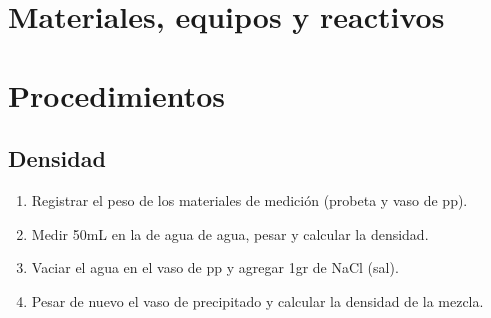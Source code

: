 \section{Materiales, equipos y reactivos}

\begin{table}[H]
\end{table}

\section{Procedimientos}

\subsection{Densidad}
\begin{enumerate}   
    \item Registrar el peso de los materiales de medición (probeta y vaso de pp).
    \item Medir 50mL en la de agua de agua, pesar y calcular la densidad.
    \item Vaciar el agua en el vaso de pp y agregar 1gr de NaCl (sal).
    \item Pesar de nuevo el vaso de precipitado y calcular la densidad de la mezcla.
\end{enumerate}


